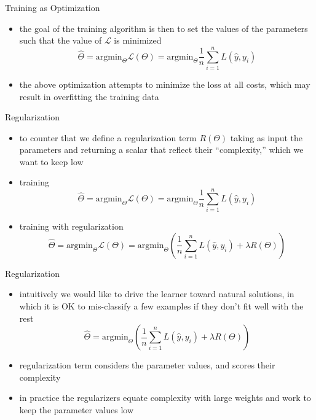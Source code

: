 \begin{frame}{Training as Optimization}
    \begin{itemize}
        \item<1-> the goal of the training algorithm is then to set the values of the parameters such that the value of $\mathcal{L}$ is minimized
        \begin{equation*}
            \hat{\Theta} = \text{argmin}_{\Theta} \mathcal{L}(\Theta) =\text{argmin}_{\Theta} \frac{1}{n}\sum_{i=1}^{n}L(\hat{y},y_i) 
        \end{equation*}
      \item<2-> the above optimization attempts to minimize the loss at all costs, which may result in overfitting the training data 
      \end{itemize}
\end{frame}
\begin{frame}{Regularization}
    \begin{itemize}
     
        \item<1-> to counter that we define a regularization term $R(\Theta)$ taking as input the parameters and returning a scalar that reflect their ``complexity,'' which we want to keep low
        
        \item<2-> training 
        \begin{equation*}
            \hat{\Theta} = \text{argmin}_{\Theta} \mathcal{L}(\Theta) =\text{argmin}_{\Theta} \frac{1}{n}\sum_{i=1}^{n}L(\hat{y},y_i) 
        \end{equation*}
     
     \item<3-> training with regularization
        \begin{equation*}
            \hat{\Theta} = \text{argmin}_{\Theta} \mathcal{L}(\Theta) =\text{argmin}_{\Theta} \left( \frac{1}{n}\sum_{i=1}^{n}L(\hat{y},y_i)  + \lambda R(\Theta) \right)
        \end{equation*}
    \end{itemize}
\end{frame}
\begin{frame}{Regularization}
    \begin{itemize}
        \item<1-> intuitively we would like to drive the learner toward natural solutions, in which it is OK to mis-classify a few examples if they don’t fit well with the rest
        \begin{equation*}
            \hat{\Theta} =\text{argmin}_{\Theta} \left( \frac{1}{n}\sum_{i=1}^{n}L(\hat{y},y_i)  + \lambda R(\Theta) \right)
        \end{equation*}
        \item<2-> regularization term considers the parameter values, and scores their complexity
        \item<3-> in practice the regularizers equate complexity with large weights and work to keep the parameter values low 
        
    \end{itemize}
\end{frame}
